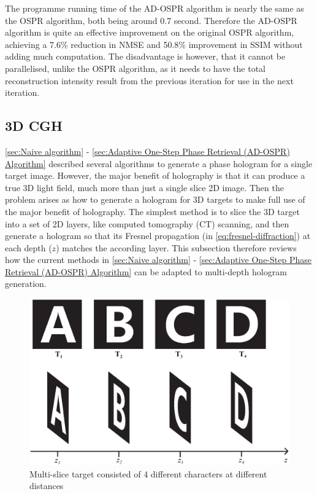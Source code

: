 The programme running time of the AD-OSPR algorithm is nearly the same as the OSPR algorithm, both being around 0.7 second. Therefore the AD-OSPR algorithm is quite an effective improvement on the original OSPR algorithm, achieving a 7.6\% reduction in NMSE and 50.8\% improvement in SSIM without adding much computation. The disadvantage is however, that it cannot be parallelised, unlike the OSPR algorithm, as it needs to have the total reconstruction intensity result from the previous iteration for use in the next iteration.


\newpage
\subsection{3D CGH}
\cref{sec:Naive algorithm} - \cref{sec:Adaptive One-Step Phase Retrieval (AD-OSPR) Algorithm} described several algorithms to generate a phase hologram for a single target image. However, the major benefit of holography is that it can produce a true 3D light field, much more than just a single slice 2D image. Then the problem arises as how to generate a hologram for 3D targets to make full use of the major benefit of holography. The simplest method is to slice the 3D target into a set of 2D layers, like computed tomography (CT) scanning, and then generate a hologram so that its Fresnel propagation (in \cref{eq:fresnel-diffraction}) at each depth ($z$) matches the according layer. This subsection therefore reviews how the current methods in \cref{sec:Naive algorithm} - \cref{sec:Adaptive One-Step Phase Retrieval (AD-OSPR) Algorithm} can be adapted to multi-depth hologram generation.

\begin{figure}[H]
	\centering
	\includegraphics[width=1.0\textwidth]{ABCD/ABCD_target.eps}
	\caption{Multi-slice target consisted of 4 different characters at different distances}
	\label{fig:ABCD_target}
\end{figure}

